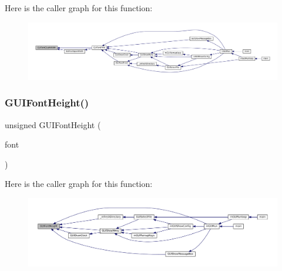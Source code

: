 Here is the caller graph for this function\+:
\nopagebreak
\begin{figure}[H]
\begin{center}
\leavevmode
\includegraphics[width=350pt]{3ds_2gui-font_8c_a4b38c72440f93dd3f4c6d01848a23203_icgraph}
\end{center}
\end{figure}
\mbox{\label{3ds_2gui-font_8c_a6d539c7b23450b8918bb6499e2c11042}} 
\subsubsection{\texorpdfstring{G\+U\+I\+Font\+Height()}{GUIFontHeight()}}
{\footnotesize\ttfamily unsigned G\+U\+I\+Font\+Height (\begin{DoxyParamCaption}\item[{const struct G\+U\+I\+Font $\ast$}]{font }\end{DoxyParamCaption})}

Here is the caller graph for this function\+:
\nopagebreak
\begin{figure}[H]
\begin{center}
\leavevmode
\includegraphics[width=350pt]{3ds_2gui-font_8c_a6d539c7b23450b8918bb6499e2c11042_icgraph}
\end{center}
\end{figure}
\mbox{\label{3ds_2gui-font_8c_a70534a7637eda192a15884d8930a61b8}} 
